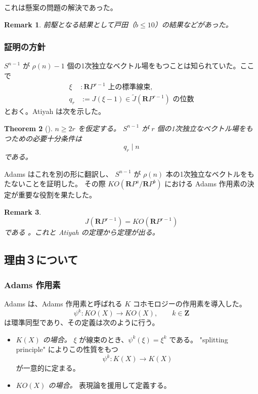 \documentclass[uplatex,dvipdfmx,a4paper,12pt]{jlreq}
\newtheorem{theorem}{Theorem}
\newtheorem{remark}[theorem]{Remark}
\newcommand{\Z}{\mathbf{Z}}
\begin{document}
これは懸案の問題の解決であった。

\begin{remark}
  前駆となる結果として戸田（$b \leq 10$）の結果などがあった。
\end{remark}

\subsubsection{証明の方針}

$S^{n-1}$ が $\rho(n) - 1$ 個の1次独立なベクトル場をもつことは知られていた。ここで
\begin{align*}
  \xi   &: \mathbf{R}P^{r-1} \text{ 上の標準線束}, \\
  q_r   &:= J(\xi - 1) \in \tilde{J}(\mathbf{R}P^{r-1}) \text{ の位数}
\end{align*}
とおく。Atiyah は次を示した。

\begin{theorem}[\cite{At61}]
  $n \geq 2r$ を仮定する。
  $S^{n-1}$ が $r$ 個の1次独立なベクトル場をもつための必要十分条件は
  \[
    q_r \mid n
  \]
  である。
\end{theorem}

Adams はこれを別の形に翻訳し、
$S^{n-1}$ が $\rho(n)$ 本の1次独立なベクトルをもたないことを証明した。
その際 $KO(\mathbf{R}P^a / \mathbf{R}P^b)$ における
Adams 作用素の決定が重要な役割を果たした。

\begin{remark}
  \[
    J(\mathbf{R}P^{r-1}) = KO(\mathbf{R}P^{r-1})
  \]
  である \cite{Ad65}。これと Atiyah の定理から定理が出る。
\end{remark}

\subsection{理由３について}

\subsubsection{Adams 作用素}

Adams は、Adams 作用素と呼ばれる $K$ コホモロジーの作用素を導入した。
\[
  \psi^k : KO(X) \longrightarrow KO(X), \qquad k \in \Z
\]
は環準同型であり、その定義は次のように行う。
\begin{itemize}
  \item \textit{$K(X)$ の場合。}
        $\xi$ が線束のとき、$\psi^k(\xi) = \xi^k$ である。
        "splitting principle" によりこの性質をもつ
        \[
          \psi^k : K(X) \longrightarrow K(X)
        \]
        が一意的に定まる。
  \item \textit{$KO(X)$ の場合。}
        表現論を援用して定義する。
\end{itemize}
\end{document}
